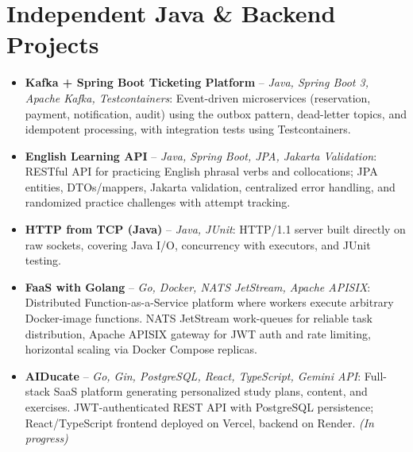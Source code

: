 \documentclass[11pt,a4paper,sans]{moderncv}
\begin{document}
\section{Independent Java \& Backend Projects}
\vspace{1pt}
\begin{itemize}

\item \textbf{Kafka + Spring Boot Ticketing Platform} -- \textit{Java, Spring Boot 3, Apache Kafka, Testcontainers}: Event-driven microservices (reservation, payment, notification, audit) using the outbox pattern, dead-letter topics, and idempotent processing, with integration tests using Testcontainers.

\item \textbf{English Learning API} -- \textit{Java, Spring Boot, JPA, Jakarta Validation}: RESTful API for practicing English phrasal verbs and collocations; JPA entities, DTOs/mappers, Jakarta validation, centralized error handling, and randomized practice challenges with attempt tracking.

\item \textbf{HTTP from TCP (Java)} -- \textit{Java, JUnit}: HTTP/1.1 server built directly on raw sockets, covering Java I/O, concurrency with executors, and JUnit testing.

\item \textbf{FaaS with Golang} -- \textit{Go, Docker, NATS JetStream, Apache APISIX}: Distributed Function-as-a-Service platform where workers execute arbitrary Docker-image functions. NATS JetStream work-queues for reliable task distribution, Apache APISIX gateway for JWT auth and rate limiting, horizontal scaling via Docker Compose replicas.

\item \textbf{AIDucate} -- \textit{Go, Gin, PostgreSQL, React, TypeScript, Gemini API}: Full-stack SaaS platform generating personalized study plans, content, and exercises. JWT-authenticated REST API with PostgreSQL persistence; React/TypeScript frontend deployed on Vercel, backend on Render. \textit{(In progress)}

\end{itemize}

\end{document}
